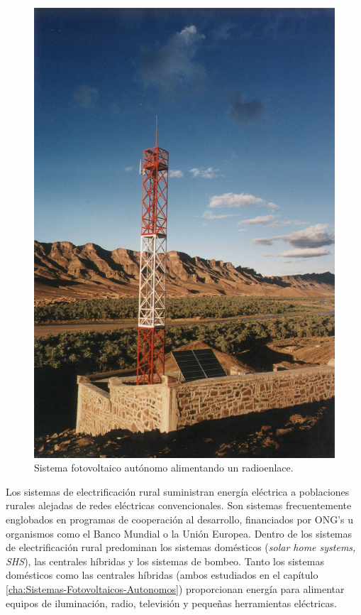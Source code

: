 %
\begin{figure}
\begin{centering}
\includegraphics[scale=0.6]{../figs/TelefoniaRural}
\end{centering}

\caption{Sistema fotovoltaico autónomo alimentando un radioenlace.\label{fig:SistemaRadioenlace}}

\end{figure}


Los sistemas de electrificación rural suministran energía eléctrica
a poblaciones rurales alejadas de redes eléctricas convencionales.
Son sistemas frecuentemente englobados en programas de cooperación
al desarrollo, financiados por ONG's u organismos como el Banco Mundial
o la Unión Europea. Dentro de los sistemas de electrificación rural
predominan los sistemas domésticos (\emph{solar home systems, SHS}),
las centrales híbridas y los sistemas de bombeo. Tanto los sistemas
domésticos como las centrales híbridas (ambos estudiados en el capítulo
\ref{cha:Sistemas-Fotovoltaicos-Autonomos}) proporcionan energía
para alimentar equipos de iluminación, radio, televisión y pequeñas
herramientas eléctricas. 

